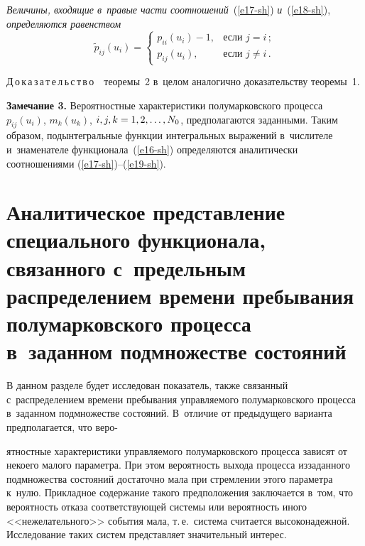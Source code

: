 \begin{multicols}{2}
\textit{Величины, входящие в~правые части соотношений}~(\ref{e17-sh}) %
\textit{и}~(\ref{e18-sh}), \textit{определяются 
равенством}
\begin{equation}
\widetilde{p}_{ij}(u_i)
=\begin{cases}
p_{ii}(u_{i})-1,&\mbox{если } j=i\,;\\
p_{ij}(u_i),&\mbox{если } j\neq{i}\,.
\end{cases}
\label{e19-sh}
\end{equation}


\noindent
Д\,о\,к\,а\,з\,а\,т\,е\,л\,ь\,с\,т\,в\,о\ \ тео\-ре\-мы~2 в~целом аналогично доказательству тео\-ре\-мы~1. 

\smallskip

\noindent
\textbf{Замечание 3.} Вероятностные характеристики полумарковского 
процесса~$p_{ij}(u_i)$, $m_k(u_k)$, $i,j,k\hm=1,2,\dots,N_0$, предполагаются 
заданными. Таким образом, подынтегральные функции интегральных выражений 
в~числителе и~знаменателе функционала~(\ref{e16-sh}) определяются аналитически соотношениями 
(\ref{e17-sh})--(\ref{e19-sh}).

\vspace*{-4pt}

\section{Аналитическое представление специального функционала, связанного 
с~предельным распределением времени пребывания полумарковского процесса в~заданном 
подмножестве состояний}

\vspace*{-2pt}

В данном разделе будет исследован показатель, также связанный с~распределением 
времени пребывания управ\-ля\-емо\-го полумарковского процесса в~заданном подмножестве 
состояний. В~отличие от предыдущего варианта предполагается, что веро-\linebreak\vspace*{-12pt}

\pagebreak

\noindent
ятностные 
характеристики управ\-ля\-емо\-го полумарковского процесса зависят от некоего малого 
параметра. При этом ве\-ро\-ят\-ность выхода процесса из\linebreak заданного подмножества 
состояний достаточно \mbox{мала} при стремлении этого па\-ра\-ме\-тра к~нулю. Прикладное 
содержание такого предположения \mbox{заключается} в~том, что ве\-ро\-ят\-ность отказа 
со\-от\-вет\-ст\-ву\-ющей сис\-те\-мы или вероятность иного <<нежелательного>> события мала, 
т.\,е.\ сис\-те\-ма считается высоконадежной. Исследование таких сис\-тем пред\-став\-ля\-ет 
значительный интерес.


\end{multicols}
